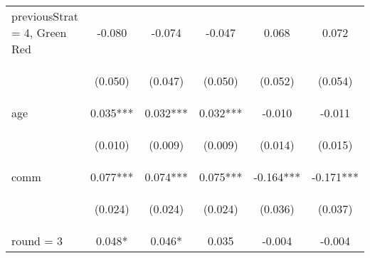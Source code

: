 \begin{center}
\begin{tabular}{lccccc}
previousStrat = 4, Green Red & -0.080 & -0.074 & -0.047 & 0.068 & 0.072 \\
\vspace{4pt} & \begin{footnotesize}(0.050)\end{footnotesize} & \begin{footnotesize}(0.047)\end{footnotesize} & \begin{footnotesize}(0.050)\end{footnotesize} & \begin{footnotesize}(0.052)\end{footnotesize} & \begin{footnotesize}(0.054)\end{footnotesize} \\
age & 0.035*** & 0.032*** & 0.032*** & -0.010 & -0.011 \\
\vspace{4pt} & \begin{footnotesize}(0.010)\end{footnotesize} & \begin{footnotesize}(0.009)\end{footnotesize} & \begin{footnotesize}(0.009)\end{footnotesize} & \begin{footnotesize}(0.014)\end{footnotesize} & \begin{footnotesize}(0.015)\end{footnotesize} \\
comm & 0.077*** & 0.074*** & 0.075*** & -0.164*** & -0.171*** \\
\vspace{4pt} & \begin{footnotesize}(0.024)\end{footnotesize} & \begin{footnotesize}(0.024)\end{footnotesize} & \begin{footnotesize}(0.024)\end{footnotesize} & \begin{footnotesize}(0.036)\end{footnotesize} & \begin{footnotesize}(0.037)\end{footnotesize} \\
round = 3 & 0.048* & 0.046* & 0.035 & -0.004 & -0.004 \\

\end{tabular}
\end{center}
